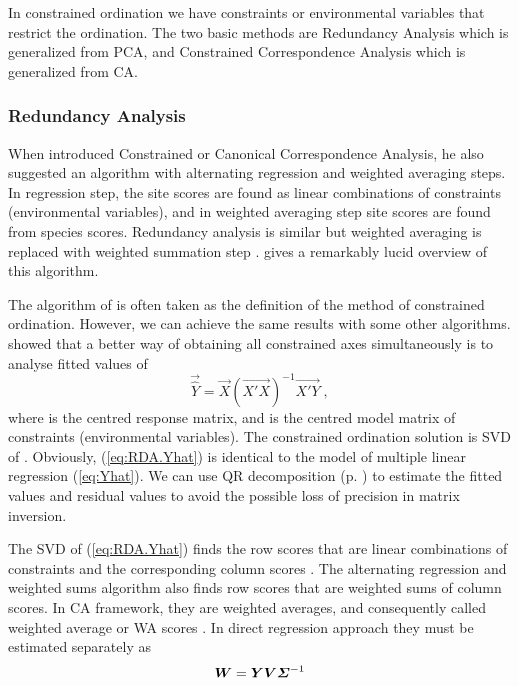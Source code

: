 In constrained ordination we have constraints or environmental
variables that restrict the ordination. The two basic methods are
Redundancy Analysis which is generalized from PCA, and Constrained
Correspondence Analysis which is generalized from CA.

\subsubsection{Redundancy Analysis}

When \citet{terB86} introduced Constrained or Canonical
Correspondence Analysis, he also suggested an algorithm with
alternating regression and weighted averaging steps. In regression
step, the site scores are found as linear combinations of constraints
(environmental variables), and in weighted averaging step site scores
are found from species scores. Redundancy analysis is similar but
weighted averaging is replaced with weighted summation step
\citep{terB86, Jong87}. \citet{Palm93} gives a remarkably
lucid overview of this algorithm.

The algorithm of \citet{terB86} is often taken as the definition of
the method of constrained ordination. However, we can achieve the same
results with some other algorithms. \citet{LegeLege98} showed that a
better way of obtaining all constrained axes simultaneously is to
analyse fitted values  of
\begin{equation}
  \label{eq:RDA.Yhat}
  \vec{\hat Y} = \vec{X} (\vec{X'X})^{-1} \vec{X'Y} \;,
\end{equation}
where  is the centred response matrix, and  is the
centred model matrix of constraints (environmental variables).  The
constrained ordination solution is SVD of .  Obviously,
(\ref{eq:RDA.Yhat}) is identical to the model of multiple linear
regression (\ref{eq:Yhat}). We can use QR decomposition
(p. \pageref{sec:QR}) to estimate the fitted values and residual
values to avoid the possible loss of precision in matrix inversion.

The SVD of (\ref{eq:RDA.Yhat})  finds the row scores  that are linear
combinations of constraints and the corresponding column scores
.  The alternating regression and weighted sums algorithm also
finds row scores  that are weighted sums of column scores. In
CA framework, they are weighted averages, and consequently called
weighted average or WA scores \citep{Palm93}. In direct regression
approach they must be estimated separately as
\begin{equation}
  \label{eq:RDA.W}
  \vec{W} = \vec{Y V \bSigma}^{-1}
\end{equation}

